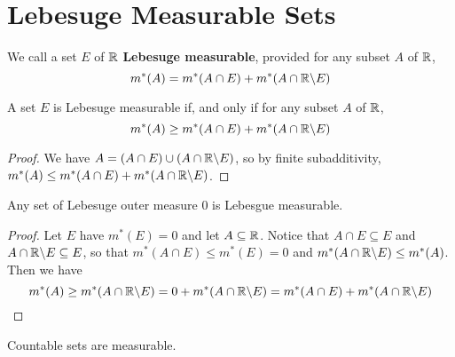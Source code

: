 \section{Lebesuge Measurable Sets}

\begin{definition}
    We call a set $E$ of  $\mathbb{R}$  \textbf{Lebesuge measurable}, provided for any
    subset $A$ of  $\mathbb{R}$,
    \begin{equation*}
        m^\ast(A)=m^\ast(A \cap E)+m^\ast(A \cap \mathbb{R}\backslash E)
    \end{equation*}
\end{definition}

\begin{lemma}\label{2.2.1}
    A set $E$ is Lebesuge measurable if, and only if for any subset $A$ of $\mathbb{R}$,
     \begin{equation*}
        m^\ast(A) \geq m^\ast(A \cap E)+m^\ast(A \cap \mathbb{R}\backslash E)
     \end{equation*}
\end{lemma}
\begin{proof}
    We have $A=(A \cap E) \cup (A \cap \mathbb{R}\backslash E)$, so by finite
    subadditivity, $m^\ast(A) \leq m^\ast(A \cap E)+m^\ast(A \cap \mathbb{R}\backslash E)$.
\end{proof}

\begin{lemma}\label{2.2.2}
    Any set of Lebesuge outer measure $0$ is Lebesgue measurable.
\end{lemma}
\begin{proof}
    Let $E$ have  $m^\ast(E)=0$ and let $A \subseteq \mathbb{R}$. Notice that  $A \cap E
    \subseteq E$ and  $A \cap \mathbb{R}\backslash E \subseteq E$, so that $m^\ast(A \cap E)
    \leq m^\ast(E)=0$ and $m^\ast(A \cap \mathbb{R}\backslash E) \leq m^\ast(A)$. Then we
    have
    \begin{equation*}
        m^\ast(A) \geq m^\ast(A \cap \mathbb{R}\backslash E)=0+m^\ast(A \cap
        \mathbb{R}\backslash E)=m^\ast(A \cap E)+m^\ast(A \cap \mathbb{R}\backslash E)
    \end{equation*}
\end{proof}
\begin{corollary}
    Countable sets are measurable.
\end{corollary}

